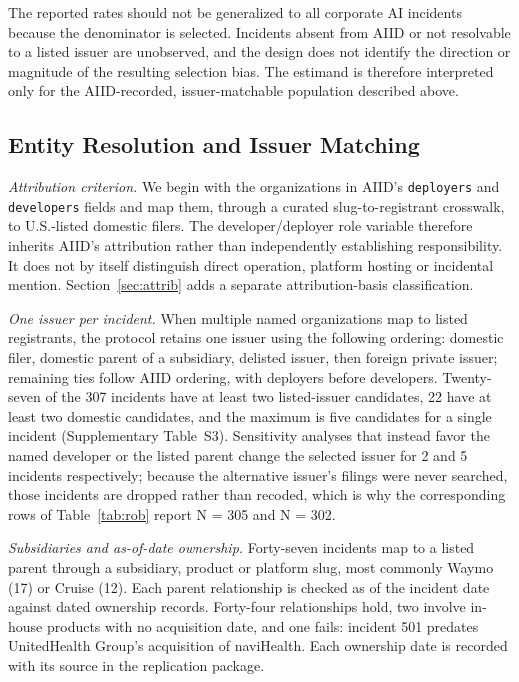\documentclass[utf8]{FrontiersinHarvard}
\begin{document}
The reported rates should not be generalized to all corporate AI incidents because the denominator is selected. Incidents absent from AIID or not resolvable to a listed issuer are unobserved, and the design does not identify the direction or magnitude of the resulting selection bias. The estimand is therefore interpreted only for the AIID-recorded, issuer-matchable population described above.

\subsection{Entity Resolution and Issuer Matching}\label{sec:entity}
\textit{Attribution criterion.} We begin with the organizations in AIID's \texttt{deployers} and \texttt{developers} fields and map them, through a curated slug-to-registrant crosswalk, to U.S.-listed domestic filers. The developer/deployer role variable therefore inherits AIID's attribution rather than independently establishing responsibility. It does not by itself distinguish direct operation, platform hosting or incidental mention. Section~\ref{sec:attrib} adds a separate attribution-basis classification.

\textit{One issuer per incident.} When multiple named organizations map to listed registrants, the protocol retains one issuer using the following ordering: domestic filer, domestic parent of a subsidiary, delisted issuer, then foreign private issuer; remaining ties follow AIID ordering, with deployers before developers. Twenty-seven of the 307 incidents have at least two listed-issuer candidates, 22 have at least two domestic candidates, and the maximum is five candidates for a single incident (Supplementary Table~S3). Sensitivity analyses that instead favor the named developer or the listed parent change the selected issuer for 2 and 5 incidents respectively; because the alternative issuer's filings were never searched, those incidents are dropped rather than recoded, which is why the corresponding rows of Table~\ref{tab:rob} report N = 305 and N = 302.

\textit{Subsidiaries and as-of-date ownership.} Forty-seven incidents map to a listed parent through a subsidiary, product or platform slug, most commonly Waymo (17) or Cruise (12). Each parent relationship is checked as of the incident date against dated ownership records. Forty-four relationships hold, two involve in-house products with no acquisition date, and one fails: incident 501 predates UnitedHealth Group's acquisition of naviHealth. Each ownership date is recorded with its source in the replication package.
\end{document}
